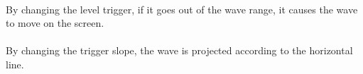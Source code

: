 \documentclass[11pt]{article}
\begin{document}
\begin{question}
{        \paragraph*{} By changing the level trigger, if it goes out of the wave range, it causes the wave to move on the screen.

        \paragraph*{} By changing the trigger slope, the wave is projected according to the horizontal line.
    }


\end{question}

\end{document}
